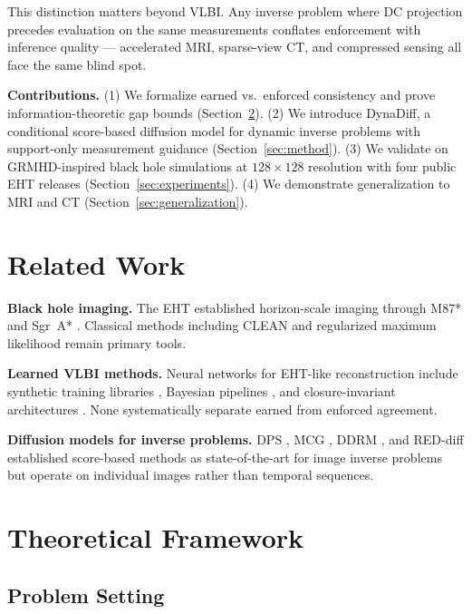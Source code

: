 \documentclass[11pt]{article}
\begin{document}
This distinction matters beyond VLBI. Any inverse problem where DC projection precedes evaluation on the same measurements conflates enforcement with inference quality --- accelerated MRI, sparse-view CT, and compressed sensing all face the same blind spot.

\textbf{Contributions.} (1) We formalize earned vs.\ enforced consistency and prove information-theoretic gap bounds (Section~\ref{sec:theory}). (2) We introduce DynaDiff, a conditional score-based diffusion model for dynamic inverse problems with support-only measurement guidance (Section~\ref{sec:method}). (3) We validate on GRMHD-inspired black hole simulations at $128\times128$ resolution with four public EHT releases (Section~\ref{sec:experiments}). (4) We demonstrate generalization to MRI and CT (Section~\ref{sec:generalization}).

\section{Related Work}

\textbf{Black hole imaging.} The EHT established horizon-scale imaging through M87* \citep{EHT2019M87I, EHT2019M87IV} and Sgr~A* \citep{EHT2022SgrAI, EHT2022SgrAIII}. Classical methods including CLEAN \citep{Hogbom1974CLEAN} and regularized maximum likelihood \citep{Chael2018ClosureImaging, Akiyama2017SparseM87} remain primary tools.

\textbf{Learned VLBI methods.} Neural networks for EHT-like reconstruction include synthetic training libraries \citep{Janssen2025DLI, Janssen2025DLII}, Bayesian pipelines \citep{Janssen2025DLIII}, and closure-invariant architectures \citep{Lai2025ClosureInvariants}. None systematically separate earned from enforced agreement.

\textbf{Diffusion models for inverse problems.} DPS \citep{Chung2023DPS}, MCG \citep{Chung2023MCG}, DDRM \citep{Kawar2022DDRM}, and RED-diff \citep{Mardani2023REDDiff} established score-based methods as state-of-the-art for image inverse problems but operate on individual images rather than temporal sequences.

\section{Theoretical Framework}\label{sec:theory}

\subsection{Problem Setting}
\end{document}
